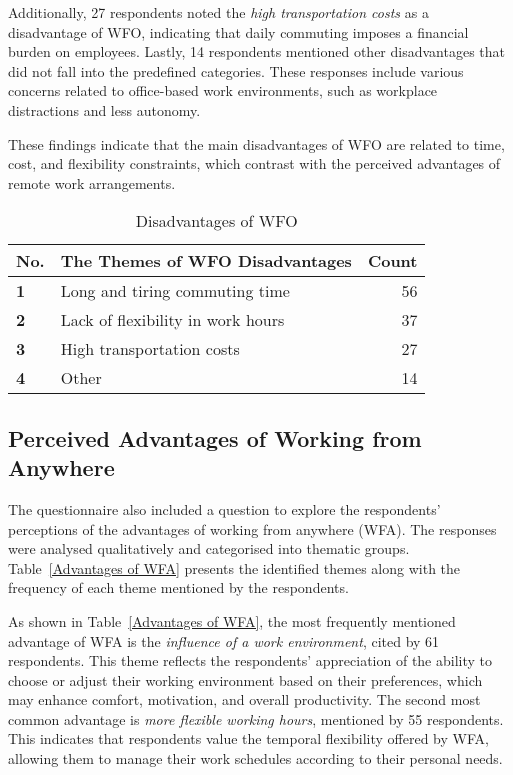 \documentclass[a4paper, conference]{IEEEtran}
\begin{document}
Additionally, 27 respondents noted the \textit{high transportation costs} as a disadvantage of WFO, indicating that daily commuting imposes a financial burden on employees. Lastly, 14 respondents mentioned other disadvantages that did not fall into the predefined categories. These responses include various concerns related to office-based work environments, such as workplace distractions and less autonomy.

These findings indicate that the main disadvantages of WFO are related to time, cost, and flexibility constraints, which contrast with the perceived advantages of remote work arrangements.


\begin{table}[ht]
	\caption{Disadvantages of WFO}
	\label{Disadvantages of WFO}
	\begin{tabular}{|p{}|p{}|r|}
		\hline
		\multicolumn{1}{|c|}{\textbf{No.}} & \multicolumn{1}{c|}{\textbf{The Themes of WFO Disadvantages}} & \multicolumn{1}{c|}{\textbf{Count}} \\ \hline
		\textbf{1}             & Long and tiring commuting time            & 56 %
		\\ \hline
		\textbf{2}             & Lack of flexibility in work hours          & 37 %
		\\ \hline
		\textbf{3}             & High transportation costs              & 27 %
		\\ \hline
		\textbf{4}             & Other          & 14
		\\ \hline
	\end{tabular}
\end{table}


\subsection{Perceived Advantages of Working from Anywhere}
\label{sec:advantage-wfa}

The questionnaire also included a question to explore the respondents' perceptions of the advantages of working from anywhere (WFA). The responses were analysed qualitatively and categorised into thematic groups. Table~\ref{Advantages of WFA} presents the identified themes along with the frequency of each theme mentioned by the respondents.

As shown in Table~\ref{Advantages of WFA}, the most frequently mentioned advantage of WFA is the \textit{influence of a work environment}, cited by 61 respondents. This theme reflects the respondents' appreciation of the ability to choose or adjust their working environment based on their preferences, which may enhance comfort, motivation, and overall productivity. The second most common advantage is \textit{more flexible working hours}, mentioned by 55 respondents. This indicates that respondents value the temporal flexibility offered by WFA, allowing them to manage their work schedules according to their personal needs.
\end{document}
